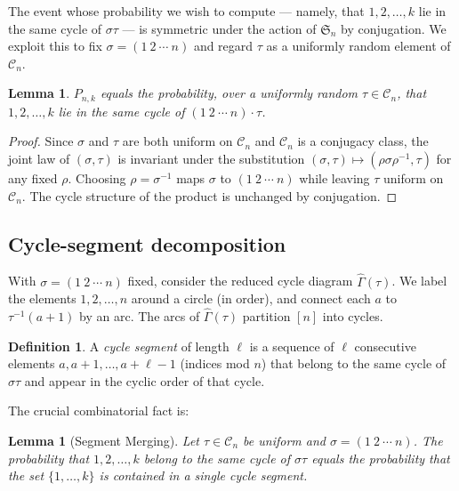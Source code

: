 \documentclass[12pt,a4paper]{article}
\newtheorem{lemma}[theorem]{Lemma}
\theoremstyle{definition}
\newtheorem{definition}[theorem]{Definition}
\newcommand{\Sn}{\mathfrak{S}_n}
\newcommand{\Cn}{\mathcal{C}_n}
\begin{document}
The event whose probability we wish to compute — namely, that
$1,2,\dots,k$ lie in the same cycle of $\sigma\tau$ — is symmetric
under the action of $\Sn$ by conjugation.  We exploit this to fix
$\sigma=(1\ 2\ \cdots\ n)$ and regard $\tau$ as a uniformly random
element of $\Cn$.

\begin{lemma}
\label{lem:symmetry}
$P_{n,k}$ equals the probability, over a uniformly random $\tau\in\Cn$,
that $1,2,\dots,k$ lie in the same cycle of $(1\ 2\ \cdots\ n)\cdot\tau$.
\end{lemma}

\begin{proof}
Since $\sigma$ and $\tau$ are both uniform on $\Cn$ and $\Cn$ is a
conjugacy class, the joint law of $(\sigma,\tau)$ is invariant under
the substitution $(\sigma,\tau)\mapsto(\rho\sigma\rho^{-1},\tau)$ for
any fixed $\rho$.  Choosing $\rho=\sigma^{-1}$ maps $\sigma$ to
$(1\ 2\ \cdots\ n)$ while leaving $\tau$ uniform on $\Cn$.  The cycle
structure of the product is unchanged by conjugation.
\end{proof}

\subsection{Cycle-segment decomposition}

With $\sigma=(1\ 2\ \cdots\ n)$ fixed, consider the reduced cycle
diagram $\widehat\Gamma(\tau)$.  We label the elements $1,2,\dots,n$
around a circle (in order), and connect each $a$ to $\tau^{-1}(a+1)$
by an arc.  The arcs of $\widehat\Gamma(\tau)$ partition $[n]$ into
cycles.

\begin{definition}
\label{def:segment}
A \emph{cycle segment} of length $\ell$ is a sequence of $\ell$
consecutive elements $a, a+1, \dots, a+\ell-1$ (indices mod $n$)
that belong to the same cycle of $\sigma\tau$ and appear in the cyclic
order of that cycle.
\end{definition}

The crucial combinatorial fact is:

\begin{lemma}[Segment Merging]
\label{lem:segment}
Let $\tau\in\Cn$ be uniform and $\sigma=(1\ 2\ \cdots\ n)$.  The
probability that $1,2,\dots,k$ belong to the same cycle of $\sigma\tau$
equals the probability that the set $\{1,\dots,k\}$ is contained in a
single cycle segment.
\end{lemma}
\end{document}
